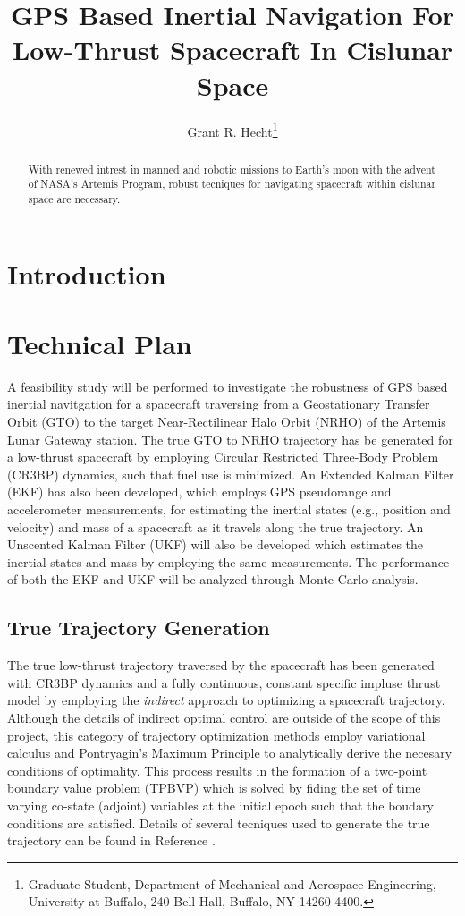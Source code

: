 \documentclass[letterpaper, submit]{AAS}			%
\begin{document}
\title{GPS Based Inertial Navigation For Low-Thrust Spacecraft In Cislunar Space}

\author{Grant R. Hecht\thanks{Graduate Student, Department of Mechanical and Aerospace Engineering, University at Buffalo, 240 Bell Hall, Buffalo, NY  14260-4400.}}

\maketitle{} 		

\begin{abstract}
With renewed intrest in manned and robotic missions to Earth's moon with the advent of NASA's Artemis Program, robust tecniques for navigating spacecraft within cislunar space are necessary. 
\end{abstract}

\section{Introduction}

\section{Technical Plan}
A feasibility study will be performed to investigate the robustness of GPS based inertial navitgation for a spacecraft traversing from a Geostationary Transfer Orbit (GTO) to the target Near-Rectilinear Halo Orbit (NRHO) of the Artemis Lunar Gateway station. The true GTO to NRHO trajectory has be generated for a low-thrust spacecraft by employing Circular Restricted Three-Body Problem (CR3BP) dynamics, such that fuel use is minimized. An Extended Kalman Filter (EKF) has also been developed, which employs GPS pseudorange and accelerometer measurements, for estimating the inertial states (e.g., position and velocity) and mass of a spacecraft as it travels along the true trajectory. An Unscented Kalman Filter (UKF) will also be developed which estimates the inertial states and mass by employing the same measurements. The performance of both the EKF and UKF will be analyzed through Monte Carlo analysis.
\subsection{True Trajectory Generation}
The true low-thrust trajectory traversed by the spacecraft has been generated with CR3BP dynamics and a fully continuous, constant specific impluse thrust model by employing the \textit{indirect} approach to optimizing a spacecraft trajectory. Although the details of indirect optimal control are outside of the scope of this project, this category of trajectory optimization methods employ variational calculus and Pontryagin's Maximum Principle to analytically derive the necesary conditions of optimality. This process results in the formation of a two-point boundary value problem (TPBVP) which is solved by fiding the set of time varying co-state (adjoint) variables at the initial epoch such that the boudary conditions are satisfied. Details of several tecniques used to generate the true trajectory can be found in Reference .
\end{document}
